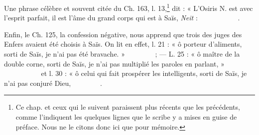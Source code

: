 \documentclass[a4paper, 11pt, oneside]{article}
\newcommand*\hieroglyhicsAAAD{}
\newcommand*\hieroglyhicsAAAG{}
\newcommand*\hieroglyhicsAAAH{}
\newcommand*\hieroglyhicsAAAQ{}
\newcommand*\hieroglyhicsAAAW{\raisebox{0.5ex}{}}
\newcommand*\hieroglyhicsAABC{\raisebox{0.5ex}{}}
\newcommand*\hieroglyhicsAABR{}
\newcommand*\hieroglyhicsAACJ{}
\newcommand*\hieroglyhicsAACM{}
\newcommand*\hieroglyhicsAACN{\raisebox{1ex}{}}
\newcommand*\hieroglyhicsAACR{}
\newcommand*\hieroglyhicsAACY{}
\newcommand*\hieroglyhicsAADB{}
\newcommand*\hieroglyhicsAADC{\raisebox{0.5ex}{}}
\newcommand*\hieroglyhicsAADF{}
\newcommand*\hieroglyhicsAADG{}
\newcommand*\hieroglyhicsAADH{}
\newcommand*\hieroglyhicsAADI{\raisebox{0.5ex}{}}
\newcommand*\hieroglyhicsAADJ{}
\newcommand*\hieroglyhicsAADK{}
\newcommand*\hieroglyhicsAADL{}
\newcommand*\hieroglyhicsAADM{}
\newcommand*\hieroglyhicsAADN{}
\newcommand*\hieroglyhicsAADO{}
\newcommand*\hieroglyhicsAADP{}
\newcommand*\hieroglyhicsAADQ{}
\newcommand*\hieroglyhicsAADR{}
\newcommand*\hieroglyhicsAADS{}
\newcommand*\hieroglyhicsAADT{}
\newcommand*\hieroglyhicsAADU{}
\newcommand*\hieroglyhicsAADV{\raisebox{0.5ex}{}}
\newcommand*\hieroglyhicsAADW{}
\newcommand*\hieroglyhicsAADX{}
\newcommand*\hieroglyhicsAADY{}
\newcommand*\hieroglyhicsAADZ{}
\newcommand*\hieroglyhicsAAEA{}
\newcommand*\hieroglyhicsAAEB{}
\newcommand*\hieroglyhicsAAEC{}
\newcommand*\hieroglyhicsAAED{}
\newcommand*\hieroglyhicsAAEE{}
\newcommand*\hieroglyhicsAAEF{}
\newcommand*\hieroglyhicsAAEG{}
\newcommand*\hieroglyhicsAAEH{}
\newcommand*\hieroglyhicsAAEI{}
\newcommand*\hieroglyhicsAAEJ{}
\newcommand*\hieroglyhicsAAEK{}
\begin{document}
Une phrase célèbre et souvent citée du Ch. 163, l. 13,\footnote{Ce chap. et ceux qui le suivent paraissent plus récents que les précédents, comme l'indiquent les quelques lignes que le scribe y a mises en guise de préface. Nous ne le citons donc ici que pour mémoire.} dit : « L'Osiris N. est avec l'esprit parfait, il est l'âme du grand corps qui est à Saïs, \emph{Neit} : $\hieroglyhicsAAAH\:\hieroglyhicsAADF\:\hieroglyhicsAACR\:\hieroglyhicsAADG\allowbreak\:\hieroglyhicsAADH\:\hieroglyhicsAADI\:\hieroglyhicsAADB\:\hieroglyhicsAAAH\allowbreak\:\hieroglyhicsAADJ\:\hieroglyhicsAADK\:\hieroglyhicsAADL\:\hieroglyhicsAADM\allowbreak\:\hieroglyhicsAADN\:\hieroglyhicsAACN\:\hieroglyhicsAADO\allowbreak\:\hieroglyhicsAADP\:\hieroglyhicsAADQ\:\hieroglyhicsAADR\:\hieroglyhicsAABR\allowbreak\:\hieroglyhicsAAAD\:\hieroglyhicsAAAG\:\hieroglyhicsAADC\:\hieroglyhicsAAAW\allowbreak\:\hieroglyhicsAAAQ\:\hieroglyhicsAACY$.

Enfin, le Ch. 125, la confession négative, nous apprend que trois des juges des Enfers avaient été choisis à Saïs. On lit en effet, l. 21 : « ô porteur d'aliments, sorti de Saïs, je n'ai pas été bravache. » $\hieroglyhicsAAAH\:\hieroglyhicsAADF\:\hieroglyhicsAACJ\:\hieroglyhicsAACN\allowbreak\:\hieroglyhicsAADS\:\hieroglyhicsAADT\:\hieroglyhicsAADU\:\hieroglyhicsAADV\allowbreak\:\hieroglyhicsAAAD\:\hieroglyhicsAAAG\:\hieroglyhicsAADC\:\hieroglyhicsAAAW\allowbreak\:\hieroglyhicsAADB\:\hieroglyhicsAADW\:\hieroglyhicsAADU\allowbreak\:\hieroglyhicsAADX\:\hieroglyhicsAADF$ ; --- L. 25 : « ô maître de la double corne, sorti de Saïs, je n'ai pas multiplié les paroles en parlant, » $\hieroglyhicsAAAH\:\hieroglyhicsAADF\:\hieroglyhicsAABC\allowbreak\:\hieroglyhicsAADY\:\hieroglyhicsAADY\:\hieroglyhicsAADU\allowbreak\:\hieroglyhicsAADV\:\hieroglyhicsAAAD\:\hieroglyhicsAAAG\allowbreak\:\hieroglyhicsAADC\:\hieroglyhicsAAAW\:\hieroglyhicsAADB\allowbreak\:\hieroglyhicsAADW\:\hieroglyhicsAADZ\:\hieroglyhicsAAEA\allowbreak\:\hieroglyhicsAACM\:\hieroglyhicsAADF\:\hieroglyhicsAAEB\allowbreak\:\hieroglyhicsAAEC\:\hieroglyhicsAAED\:\hieroglyhicsAAEE\allowbreak\:\hieroglyhicsAADF\:\hieroglyhicsAAEF$ et l. 30 : « ô celui qui fait prospérer les intelligents, sorti de Saïs, je n'ai pas conjuré Dieu, $\hieroglyhicsAAAH\:\hieroglyhicsAADF\:\hieroglyhicsAAEG\allowbreak\:\hieroglyhicsAAEH\:\hieroglyhicsAAEI\:\hieroglyhicsAADU\allowbreak\:\hieroglyhicsAADV\:\hieroglyhicsAAAD\:\hieroglyhicsAAAG\allowbreak\:\hieroglyhicsAADC\:\hieroglyhicsAAAW\:\hieroglyhicsAADB\allowbreak\:\hieroglyhicsAADW\:\hieroglyhicsAAEJ\:\hieroglyhicsAADF\allowbreak\:\hieroglyhicsAAEB\:\hieroglyhicsAAEK\:\hieroglyhicsAADB$.
\end{document}
